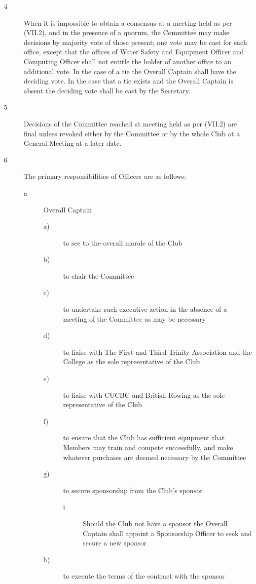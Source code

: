 \documentclass{article}
\begin{document}
\begin{description}
\begin{description}
		\item[4] When it is impossible to obtain a consensus at a meeting held as per (VII.2),
		and in the presence of a quorum, the Committee may make decisions by
		majority vote of those present; one vote may be cast for each office, except
		that the offices of Water Safety and Equipment Officer and Computing Officer
		shall not entitle the holder of another office to an additional vote. In the case
		of a tie the Overall Captain shall have the deciding vote. In the case that a tie
		exists and the Overall Captain is absent the deciding vote shall be cast by the
		Secretary.\\
		
		\item[5] Decisions of the Committee reached at meeting held as per (VII.2) are final
		unless revoked either by the Committee or by the whole Club at a General
		Meeting at a later date.\\
		
		\item[6] The primary responsibilities of Officers are as follows:
		\begin{description}
			\item[a] Overall Captain
			\begin{description}
				\item[a)] to see to the overall morale of the Club
				\item[b)]to chair the Committee
				\item[c)] to undertake such executive action in the absence of a meeting
				of the Committee as may be necessary
				\item[d)] to liaise with The First and Third Trinity Association and the
				College as the sole representative of the Club
				\item[e)] to liaise with CUCBC and British Rowing as the sole
				representative of the Club
				\item[f)] to ensure that the Club has sufficient equipment that Members
				may train and compete successfully, and make whatever
				purchases are deemed necessary by the Committee
				\item[g)] to secure sponsorship from the Club’s sponsor
				\begin{description}
					\item[i] Should the Club not have a sponsor the Overall Captain
					shall appoint a Sponsorship Officer to seek and secure a
					new sponsor
				\end{description}
				\item[h)] to execute the terms of the contract with the sponsor
			\end{description}
			

\end{description}
\end{description}
\end{description}
\end{document}
